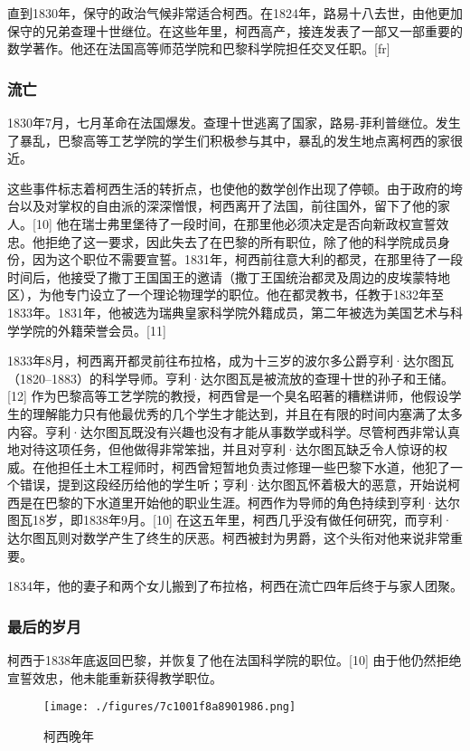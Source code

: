 直到1830年，保守的政治气候非常适合柯西。在1824年，路易十八去世，由他更加保守的兄弟查理十世继位。在这些年里，柯西高产，接连发表了一部又一部重要的数学著作。他还在法国高等师范学院和巴黎科学院担任交叉任职。[fr]
\subsubsection{流亡}  
1830年7月，七月革命在法国爆发。查理十世逃离了国家，路易-菲利普继位。发生了暴乱，巴黎高等工艺学院的学生们积极参与其中，暴乱的发生地点离柯西的家很近。

这些事件标志着柯西生活的转折点，也使他的数学创作出现了停顿。由于政府的垮台以及对掌权的自由派的深深憎恨，柯西离开了法国，前往国外，留下了他的家人。[10] 他在瑞士弗里堡待了一段时间，在那里他必须决定是否向新政权宣誓效忠。他拒绝了这一要求，因此失去了在巴黎的所有职位，除了他的科学院成员身份，因为这个职位不需要宣誓。1831年，柯西前往意大利的都灵，在那里待了一段时间后，他接受了撒丁王国国王的邀请（撒丁王国统治都灵及周边的皮埃蒙特地区），为他专门设立了一个理论物理学的职位。他在都灵教书，任教于1832年至1833年。1831年，他被选为瑞典皇家科学院外籍成员，第二年被选为美国艺术与科学学院的外籍荣誉会员。[11]

1833年8月，柯西离开都灵前往布拉格，成为十三岁的波尔多公爵亨利·达尔图瓦（1820–1883）的科学导师。亨利·达尔图瓦是被流放的查理十世的孙子和王储。[12] 作为巴黎高等工艺学院的教授，柯西曾是一个臭名昭著的糟糕讲师，他假设学生的理解能力只有他最优秀的几个学生才能达到，并且在有限的时间内塞满了太多内容。亨利·达尔图瓦既没有兴趣也没有才能从事数学或科学。尽管柯西非常认真地对待这项任务，但他做得非常笨拙，并且对亨利·达尔图瓦缺乏令人惊讶的权威。在他担任土木工程师时，柯西曾短暂地负责过修理一些巴黎下水道，他犯了一个错误，提到这段经历给他的学生听；亨利·达尔图瓦怀着极大的恶意，开始说柯西是在巴黎的下水道里开始他的职业生涯。柯西作为导师的角色持续到亨利·达尔图瓦18岁，即1838年9月。[10] 在这五年里，柯西几乎没有做任何研究，而亨利·达尔图瓦则对数学产生了终生的厌恶。柯西被封为男爵，这个头衔对他来说非常重要。

1834年，他的妻子和两个女儿搬到了布拉格，柯西在流亡四年后终于与家人团聚。
\subsubsection{最后的岁月}  
柯西于1838年底返回巴黎，并恢复了他在法国科学院的职位。[10] 由于他仍然拒绝宣誓效忠，他未能重新获得教学职位。
\begin{figure}[ht]
\centering
\texttt{[image: ./figures/7c1001f8a8901986.png]}
\caption{柯西晚年} \label{fig_August_2}
\end{figure}